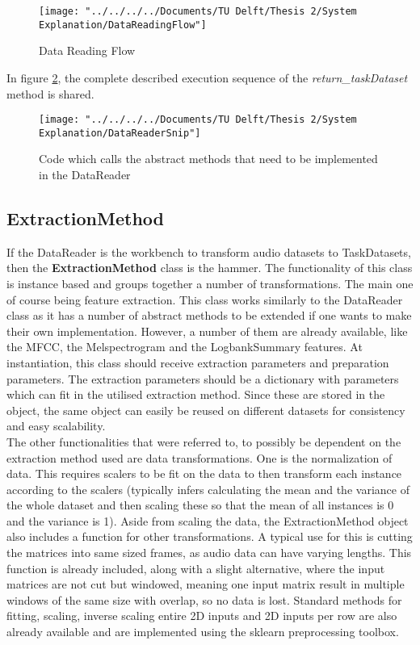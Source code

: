 \begin{figure}
	\centering
	\texttt{[image: "../../../../Documents/TU Delft/Thesis 2/System Explanation/DataReadingFlow"]}
	\caption{Data Reading Flow}
	\label{fig:datareadingflow}
\end{figure}

In figure \ref{fig:datareadersnip}, the complete described execution sequence of the \textit{return\_taskDataset} method is shared. 

\begin{figure}
	\centering
	\texttt{[image: "../../../../Documents/TU Delft/Thesis 2/System Explanation/DataReaderSnip"]}
	\caption{Code which calls the abstract methods that need to be implemented in the DataReader}
	\label{fig:datareadersnip}
\end{figure}


\subsection{ExtractionMethod} \label{Impl:DataRead:ExtractionMethod}


If the DataReader is the workbench to transform audio datasets to TaskDatasets, then the \textbf{ExtractionMethod} class is the hammer. The functionality of this class is instance based and groups together a number of transformations. The main one of course being feature extraction. This class works similarly to the DataReader class as it has a number of abstract methods to be extended if one wants to make their own implementation. However, a number of them are already available, like the MFCC, the Melspectrogram and the LogbankSummary features. At instantiation, this class should receive extraction parameters and preparation parameters. The extraction parameters should be a dictionary with parameters which can fit in the utilised extraction method. Since these are stored in the object, the same object can easily be reused on different datasets for consistency and easy scalability. \\

The other functionalities that were referred to, to possibly be dependent on the extraction method used are data transformations. One is the normalization of data. This requires scalers to be fit on the data to then transform each instance according to the scalers (typically infers calculating the mean and the variance of the whole dataset and then scaling these so that the mean of all instances is 0 and the variance is 1). Aside from scaling the data, the ExtractionMethod object also includes a function for other transformations. A typical use for this is cutting the matrices into same sized frames, as audio data can have varying lengths. This function is already included, along with a slight alternative, where the input matrices are not cut but windowed, meaning one input matrix result in multiple windows of the same size with overlap, so no data is lost. Standard methods for fitting, scaling, inverse scaling entire 2D inputs and 2D inputs per row are also already available and are implemented using the sklearn preprocessing toolbox.\\

